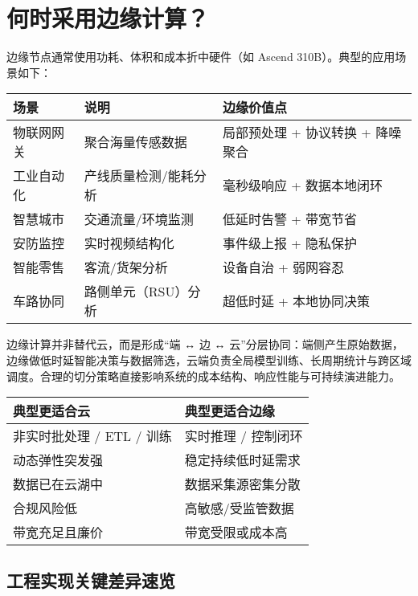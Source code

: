 \section{何时采用边缘计算？}\label{ux4f55ux65f6ux91c7ux7528ux8fb9ux7f18ux8ba1ux7b97}

边缘节点通常使用功耗、体积和成本折中硬件（如 Ascend
310B）。典型的应用场景如下：

\begin{longtable}[]{@{}lll@{}}
\toprule\noalign{}
场景 & 说明 & 边缘价值点 \\
\midrule\noalign{}
\endhead
\bottomrule\noalign{}
\endlastfoot
物联网网关 & 聚合海量传感数据 & 局部预处理 + 协议转换 + 降噪聚合 \\
工业自动化 & 产线质量检测/能耗分析 & 毫秒级响应 + 数据本地闭环 \\
智慧城市 & 交通流量/环境监测 & 低延时告警 + 带宽节省 \\
安防监控 & 实时视频结构化 & 事件级上报 + 隐私保护 \\
智能零售 & 客流/货架分析 & 设备自治 + 弱网容忍 \\
车路协同 & 路侧单元（RSU）分析 & 超低时延 + 本地协同决策 \\
\end{longtable}

边缘计算并非替代云，而是形成``端 ↔ 边 ↔
云''分层协同：端侧产生原始数据，边缘做低时延智能决策与数据筛选，云端负责全局模型训练、长周期统计与跨区域调度。合理的切分策略直接影响系统的成本结构、响应性能与可持续演进能力。

\begin{longtable}[]{@{}ll@{}}
\toprule\noalign{}
典型更适合云 & 典型更适合边缘 \\
\midrule\noalign{}
\endhead
\bottomrule\noalign{}
\endlastfoot
非实时批处理 / ETL / 训练 & 实时推理 / 控制闭环 \\
动态弹性突发强 & 稳定持续低时延需求 \\
数据已在云湖中 & 数据采集源密集分散 \\
合规风险低 & 高敏感/受监管数据 \\
带宽充足且廉价 & 带宽受限或成本高 \\
\end{longtable}

\subsection{工程实现关键差异速览}\label{ux5de5ux7a0bux5b9eux73b0ux5173ux952eux5deeux5f02ux901fux89c8}

